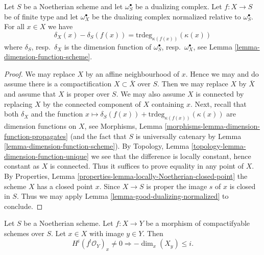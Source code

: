 \begin{lemma}
\label{lemma-good-dualizing-dimension-function}
Let $S$ be a Noetherian scheme and let $\omega_S^\bullet$ be a
dualizing complex. Let $f : X \to S$ be of finite type
and let $\omega_X^\bullet$ be the dualizing complex
normalized relative to $\omega_S^\bullet$. For all $x \in X$ we have
$$
\delta_X(x) - \delta_S(f(x)) = \text{trdeg}_{\kappa(f(x))}(\kappa(x))
$$
where $\delta_S$, resp.\ $\delta_X$
is the dimension function of
$\omega_S^\bullet$, resp.\ $\omega_X^\bullet$, see
Lemma \ref{lemma-dimension-function-scheme}.
\end{lemma}

\begin{proof}
We may replace $X$ by an affine neighbourhood of $x$. Hence we may
and do assume there is a compactification $X \subset \overline{X}$
over $S$. Then we may replace $X$ by $\overline{X}$ and assume
that $X$ is proper over $S$. We may also assume $X$ is connected
by replacing $X$ by the connected component of $X$ containing $x$.
Next, recall that both $\delta_X$ and the function
$x \mapsto \delta_S(f(x)) + \text{trdeg}_{\kappa(f(x))}(\kappa(x))$
are dimension functions on $X$, see
Morphisms, Lemma \ref{morphisms-lemma-dimension-function-propagates}
(and the fact that $S$ is universally catenary by
Lemma \ref{lemma-dimension-function-scheme}).
By Topology, Lemma \ref{topology-lemma-dimension-function-unique}
we see that the difference is locally constant, hence constant as $X$ is
connected. Thus it suffices to prove equality in any point of $X$.
By Properties, Lemma \ref{properties-lemma-locally-Noetherian-closed-point}
the scheme $X$ has a closed point $x$. Since $X \to S$ is proper
the image $s$ of $x$ is closed in $S$. Thus we may apply
Lemma \ref{lemma-good-dualizing-normalized} to conclude.
\end{proof}

\begin{lemma}
\label{lemma-shriek}
Let $S$ be a Noetherian scheme. Let $f : X \to Y$ be a morphism of
compactifyable schemes over $S$. Let $x \in X$ with image $y \in Y$.
Then
$$
H^i(f^!\mathcal{O}_Y)_x \not = 0
\Rightarrow - \dim_x(X_y) \leq i.
$$
\end{lemma}

